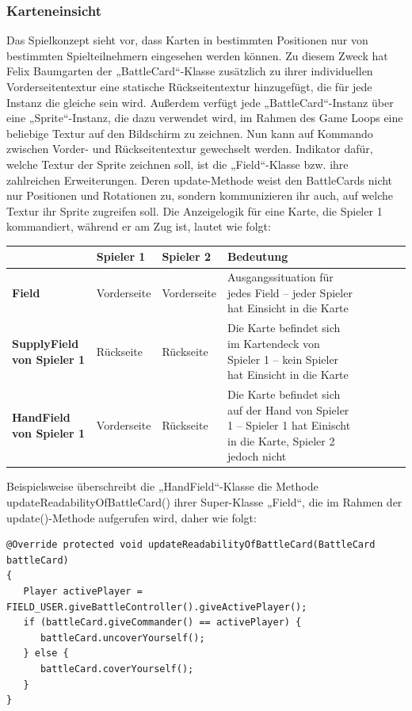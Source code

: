 \subsubsection{Karteneinsicht}
Das Spielkonzept sieht vor, dass Karten in bestimmten Positionen nur von bestimmten Spielteilnehmern eingesehen werden können.
Zu diesem Zweck hat Felix Baumgarten der „BattleCard“-Klasse zusätzlich zu ihrer individuellen Vorderseitentextur eine statische Rückseitentextur hinzugefügt, die für jede Instanz die gleiche sein wird. Außerdem verfügt jede „BattleCard“-Instanz über eine „Sprite“-Instanz, die dazu verwendet wird, im Rahmen des Game Loops eine beliebige Textur auf den Bildschirm zu zeichnen. Nun kann auf Kommando zwischen Vorder- und Rückseitentextur gewechselt werden.
Indikator dafür, welche Textur der Sprite zeichnen soll, ist die „Field“-Klasse bzw. ihre zahlreichen Erweiterungen. Deren update-Methode weist den BattleCards nicht nur Positionen und Rotationen zu, sondern kommunizieren ihr auch, auf welche Textur ihr Sprite zugreifen soll.
Die Anzeigelogik für eine Karte, die Spieler 1 kommandiert, während er am Zug ist, lautet wie folgt:
\begin{tabular}{|p{4cm}|p{4cm}|p{4cm}|p{4.5cm}| l | c | c | r |}
\hline
 & \textbf{Spieler 1}  & \textbf{Spieler 2} & \textbf{Bedeutung} \\ \hline
\textbf{Field} & Vorderseite  & Vorderseite & Ausgangssituation für jedes Field – jeder Spieler hat Einsicht in die Karte \\ \hline
\textbf{SupplyField von Spieler 1} & Rückseite & Rückseite & Die Karte befindet sich im Kartendeck von Spieler 1 – kein Spieler hat Einsicht in die Karte \\ \hline
\textbf{HandField von Spieler 1} & Vorderseite & Rückseite & Die Karte befindet sich auf der Hand von Spieler 1 – Spieler 1 hat Einischt in die Karte, Spieler 2 jedoch nicht \\
\hline
\end{tabular}
Beispielsweise überschreibt die „HandField“-Klasse die Methode updateReadabilityOfBattleCard() ihrer Super-Klasse „Field“, die im Rahmen der update()-Methode aufgerufen wird, daher wie folgt:

\begin{lstlisting}
@Override protected void updateReadabilityOfBattleCard(BattleCard battleCard)
{
   Player activePlayer = FIELD_USER.giveBattleController().giveActivePlayer();
   if (battleCard.giveCommander() == activePlayer) {
      battleCard.uncoverYourself();
   } else {
      battleCard.coverYourself();
   }
}
\end{lstlisting}

